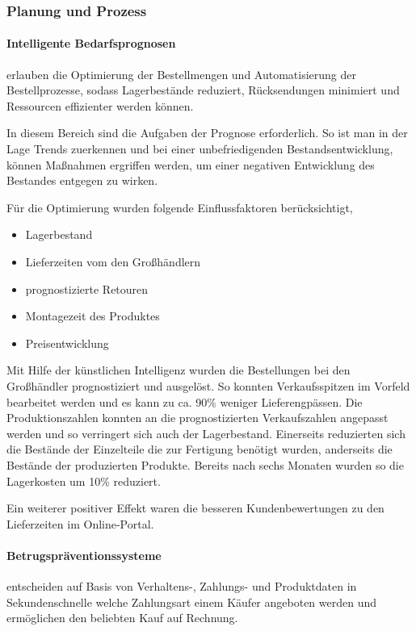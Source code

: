 \subsubsection{Planung und Prozess}
\paragraph{Intelligente Bedarfsprognosen} erlauben die Optimierung der Bestellmengen und Automatisierung der Bestellprozesse, sodass Lagerbestände reduziert, Rücksendungen minimiert und Ressourcen effizienter werden können.\vspace{0.2cm}

In diesem Bereich sind die Aufgaben der Prognose erforderlich. So ist man in der Lage Trends zuerkennen und bei einer unbefriedigenden Bestandsentwicklung, können Maßnahmen ergriffen werden, um einer negativen Entwicklung des Bestandes entgegen zu wirken.\vspace{0.2cm}

Für die Optimierung wurden folgende Einflussfaktoren berücksichtigt,

\begin{itemize}
	\item Lagerbestand
	\item Lieferzeiten vom den Großhändlern
	\item prognostizierte Retouren
	\item Montagezeit des Produktes
	\item Preisentwicklung
\end{itemize}

Mit Hilfe der künstlichen Intelligenz wurden die Bestellungen bei den Großhändler prognostiziert und ausgelöst. So konnten Verkaufsspitzen im Vorfeld bearbeitet werden und es kann zu ca. 90\% weniger Lieferengpässen. Die Produktionszahlen konnten an die prognostizierten Verkaufszahlen angepasst werden und so verringert sich auch der Lagerbestand. Einerseits reduzierten sich die Bestände der Einzelteile die zur Fertigung benötigt wurden, anderseits die Bestände der produzierten Produkte. Bereits nach sechs Monaten wurden so die Lagerkosten um 10\% reduziert.\vspace{0.2cm}

Ein weiterer positiver Effekt waren die besseren Kundenbewertungen zu den Lieferzeiten im Online-Portal.

\paragraph{Betrugspräventionssysteme} entscheiden auf Basis von Verhaltens-, Zahlungs- und Produktdaten in Sekundenschnelle welche Zahlungsart einem Käufer angeboten werden und ermöglichen den beliebten Kauf auf Rechnung.\vspace{0.2cm}

